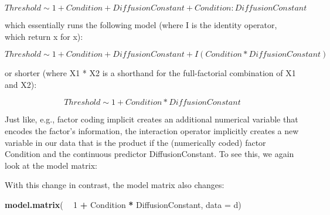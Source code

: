 \documentclass[
]{article}
\newenvironment{Shaded}{\begin{snugshade}}{\end{snugshade}}
\newcommand{\DataTypeTok}[1]{\textcolor[rgb]{0.13,0.29,0.53}{#1}}
\newcommand{\DecValTok}[1]{\textcolor[rgb]{0.00,0.00,0.81}{#1}}
\newcommand{\KeywordTok}[1]{\textcolor[rgb]{0.13,0.29,0.53}{\textbf{#1}}}
\newcommand{\NormalTok}[1]{#1}
\newcommand{\OperatorTok}[1]{\textcolor[rgb]{0.81,0.36,0.00}{\textbf{#1}}}
\newcommand{\StringTok}[1]{\textcolor[rgb]{0.31,0.60,0.02}{#1}}
\begin{document}
\[ Threshold \sim 1 + Condition + DiffusionConstant + Condition:DiffusionConstant\]

which essentially runs the following model (where I is the identity
operator, which return x for x):

\[ Threshold \sim 1 + Condition + DiffusionConstant + I(Condition * DiffusionConstant)\]

or shorter (where X1 * X2 is a shorthand for the full-factorial
combination of X1 and X2):

\[ Threshold \sim 1 + Condition*DiffusionConstant\]

Just like, e.g., factor coding implicit creates an additional numerical
variable that encodes the factor's information, the interaction operator
implicitly creates a new variable in our data that is the product if the
(numerically coded) factor Condition and the continuous predictor
DiffusionConstant. To see this, we again look at the model matrix:

With this change in contrast, the model matrix also changes:

\footnotesize

\begin{Shaded}
\begin{Highlighting}[]
\KeywordTok{model.matrix}\NormalTok{( }\OperatorTok{~}\StringTok{ }\DecValTok{1} \OperatorTok{+}\StringTok{ }\NormalTok{Condition }\OperatorTok{*}\StringTok{ }\NormalTok{DiffusionConstant, }\DataTypeTok{data =}\NormalTok{ d)}
\end{Highlighting}
\end{Shaded}
\end{document}
